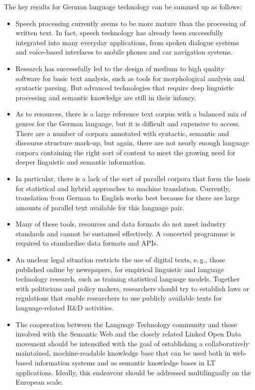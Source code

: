 \documentclass[]{../../metanetpaper}
\begin{document}
\begin{multicols}{2}
The key results for German language technology can be summed up as follows:

\begin{itemize}
\item Speech processing currently seems to be more mature than the processing of written text. In fact, speech technology has already been successfully integrated into many everyday applications, from spoken dialogue systems and voice-based interfaces to mobile phones and car navigation systems. 
\item Research has successfully led to the design of medium to high quality software for basic text analysis, such as tools for morphological analysis and syntactic parsing. But advanced technologies that require deep linguistic processing and semantic knowledge are still in their infancy. 
\item As to resources, there is a large reference text corpus with a balanced mix of genres for the German language, but it is difficult and expensive to access. There are a number of corpora annotated with syntactic, semantic and discourse structure mark-up, but again, there are not nearly enough language corpora containing the right sort of content to meet the growing need for deeper linguistic and semantic information. 
\item In particular, there is a lack of the sort of parallel corpora that form the basis for statistical and hybrid approaches to machine translation. Currently, translation from German to English works best because for there are large amounts of parallel text available for this language pair. 
\item Many of these tools, resources and data formats do not meet industry standards and cannot be sustained effectively. A concerted programme is required to standardise data formats and APIs.
\item An unclear legal situation restricts the use of digital texts, e.\,g., those published online by newspapers, for empirical linguistic and language technology research, such as training statistical language models. Together with politicians and policy makers, researchers should try to establish laws or regulations that enable researchers to use publicly available texts for language-related R\&D activities.
\item The cooperation between the Language Technology community and those involved with the Semantic Web and the closely related Linked Open Data movement should be intensified with the goal of establishing a collaboratively maintained, machine-readable knowledge base that can be used both in web-based information systems and as semantic knowledge bases in LT applications. Ideally, this endeavour should be addressed multilingually on the European scale.
\end{itemize}


\end{multicols}
\end{document}
